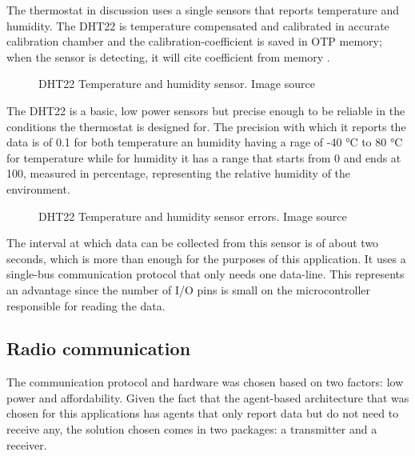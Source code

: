 \qquad The thermostat in discussion uses a single sensors that reports temperature and humidity.
The DHT22 is temperature compensated and calibrated in accurate calibration chamber and the
calibration-coefficient is saved in OTP memory; when the sensor is detecting, it will cite
coefficient from memory \cite{datasheet:dht22}.

\begin{figure}[h!]
    \label{fig:dht22}
    \centerline{}
    \caption[DHT22 Temperature and humidity sensor]{DHT22 Temperature and humidity sensor. Image source
                                                    \cite{website:tokopedia}}
    \label{fig:dht22}
\end{figure}

\qquad The DHT22 is a basic, low power sensors but precise enough to be reliable in the conditions the thermostat is
designed for. The precision with which it reports the data is of 0.1 for both temperature an humidity having a
 rage of -40 °C to 80 °C for temperature while for humidity it has a range that starts from 0 and ends at 100,
measured in percentage, representing the relative humidity of the environment.

\begin{figure}[h!]
    \label{fig:dht22_stats}
    \centerline{}
    \caption[DHT22 Temperature and humidity sensor errors]{DHT22 Temperature and humidity sensor errors. Image
                                                           source \cite{datasheet:dht22}}
    \label{fig:dht22_stats}
\end{figure}

The interval at which data can be collected from this sensor is of about two seconds, which is more than
enough for the purposes of this application. It uses a single-bus communication protocol that only needs one
data-line. This represents an advantage since the number of I/O pins is small on the microcontroller
responsible for reading the data.

\subsection{Radio communication}
\label{sec:radiocomm}

\qquad The communication protocol and hardware was chosen based on two factors: low power and affordability.
Given the fact that the agent-based architecture that was chosen for this applications has agents that only
report data but do not need to receive any, the solution chosen comes in two packages: a transmitter and a
receiver.

